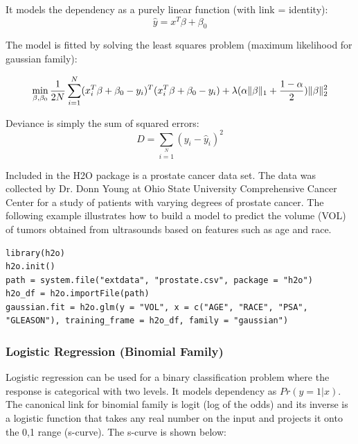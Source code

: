 It models the dependency as a purely linear function (with link = identity):
\[ \hat{y} = x^T\beta + \beta_0\]

The model is fitted by solving the least squares problem (maximum likelihood for gaussian family):

\[ \min\limits_{\beta,\beta_0} { {1 \over 2N}\sum\limits_{i=1}\limits^{N}(x_i^{T}\beta  + \beta_0- y_i)^T (x_i^{T}\beta + \beta_0 - y_i)  + \lambda (\alpha \|\beta \|_1 + {1-\alpha \over 2}) \| \beta \|_2^2} \]

Deviance is simply the sum of squared errors:
\[ D = \sum\limits_{i=1}\limits^{N}{(y_i - \hat{y}_i)^2} \]

\waterExampleInR

Included in the H2O package is a prostate cancer data set. The data was collected by Dr. Donn Young at Ohio State
University Comprehensive Cancer Center for a study of patients with varying degrees of prostate cancer. The
following example illustrates how to build a model to predict the volume (VOL) of tumors obtained from ultrasounds
based on features such as age and race.

\begin{lstlisting}[style=R]
library(h2o)
h2o.init()
path = system.file("extdata", "prostate.csv", package = "h2o")
h2o_df = h2o.importFile(path)
gaussian.fit = h2o.glm(y = "VOL", x = c("AGE", "RACE", "PSA", "GLEASON"), training_frame = h2o_df, family = "gaussian")
\end{lstlisting}

\subsubsection{Logistic Regression (Binomial Family)}
Logistic regression can be used for a binary classification problem where the response is categorical with two
levels. It models dependency as $Pr(y = 1|x)$. The canonical link for binomial family is logit (log of the odds)
and its inverse is a logistic function that takes any real number on the input and projects it onto the 0,1 range
(s-curve).  The s-curve is shown below:


